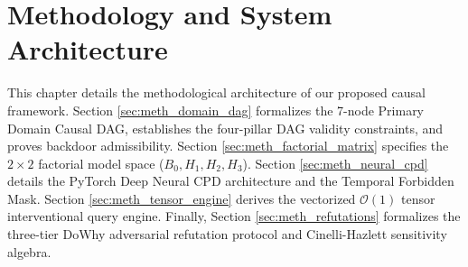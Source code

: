 \chapter{Methodology and System Architecture}
\label{chap:methods}

This chapter details the methodological architecture of our proposed causal framework. Section \ref{sec:meth_domain_dag} formalizes the 7-node Primary Domain Causal DAG, establishes the four-pillar DAG validity constraints, and proves backdoor admissibility. Section \ref{sec:meth_factorial_matrix} specifies the $2 \times 2$ factorial model space ($B_0, H_1, H_2, H_3$). Section \ref{sec:meth_neural_cpd} details the PyTorch Deep Neural CPD architecture and the Temporal Forbidden Mask. Section \ref{sec:meth_tensor_engine} derives the vectorized $\mathcal{O}(1)$ tensor interventional query engine. Finally, Section \ref{sec:meth_refutations} formalizes the three-tier DoWhy adversarial refutation protocol and Cinelli-Hazlett sensitivity algebra.






